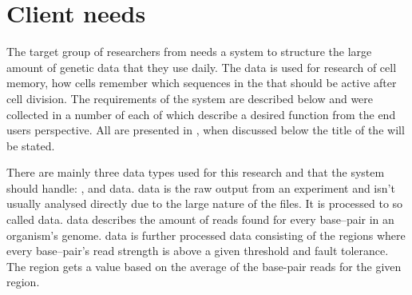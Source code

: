 


\section{Client needs}
The target group of researchers from  needs a system to structure the large amount of genetic data that they use daily. The data is used for research of cell memory, how cells remember which sequences in the  that should be active after cell division. The requirements of the system are described below and were collected in a number of  each of which describe a desired function from the end users perspective. All  are presented in , when discussed below the title of the  will be stated.

There are mainly three data types used for this research and that the system should handle: ,  and  data.  data is the raw output from an experiment and isn't usually analysed directly due to the large nature of the files. It is processed to so called  data.  data describes the amount of reads found for every base--pair in an organism's genome.  data is further processed  data consisting of the regions where every base--pair's read strength is above a given threshold and fault tolerance. The region gets a value based on the average of the base-pair reads for the given region.

